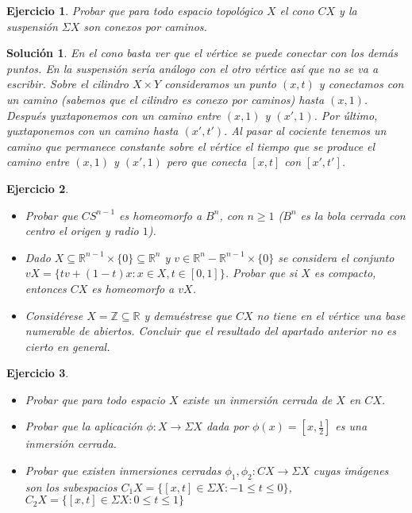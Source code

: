 \documentclass{article}
\theoremstyle{plain}
\newtheorem{exercise}{Ejercicio}
\newtheorem*{sol*}{Solución}
\begin{document}
\newpage
\begin{exercise}
Probar que para todo espacio topológico $X$ el cono $C X$ y la suspensión $\Sigma X$ son conexos por caminos.
\end{exercise}
\begin{sol*}
En el cono basta ver que el vértice se puede conectar con los demás puntos. En la suspensión sería análogo con el otro vértice así que no se va a escribir. Sobre el cilindro $X\times Y$ consideramos un punto $(x,t)$ y conectamos con un camino (sabemos que el cilindro es conexo por caminos) hasta $(x,1)$. Después yuxtaponemos con un camino entre $(x,1)$ y $(x',1)$. Por último, yuxtaponemos con un camino hasta $(x',t')$. Al pasar al cociente tenemos un camino que permanece constante sobre el vértice el tiempo que se produce el camino entre $(x,1)$ y $(x',1)$ pero que conecta $[x,t]$ con $[x',t']$.
\end{sol*}

\newpage
\begin{exercise}
\begin{itemize}
	\item Probar que $C S^{n-1}$ es homeomorfo a $B^n$, con $n \geq 1$ ($B^n$ es la bola cerrada con centro el origen y radio $1$).
	\item Dado $X \subseteq \mathbb{R}^{n-1} \times \{0\} \subseteq \mathbb{R}^n$ y $v \in \mathbb{R}^n-\mathbb{R}^{n-1} \times \{0\}$ se considera el conjunto $vX = \{ tv + (1-t)x : x \in X, t \in [0,1]\}$. Probar que si $X$ es compacto, entonces $C X$ es homeomorfo a $vX$.
	\item Considérese $X = \mathbb{Z} \subseteq \mathbb{R}$ y demuéstrese que $C X$ no tiene en el vértice una base numerable de abiertos. Concluir que el resultado del apartado anterior no es cierto en general.
\end{itemize}
\end{exercise}


\newpage
\begin{exercise}\mbox{}
\begin{itemize}
	\item Probar que para todo espacio $X$ existe un inmersión cerrada de $X$ en $C X$.
	\item Probar que la aplicación $\phi : X \to \Sigma X$ dada por $\phi(x) = [x, \frac{1}{2}]$ es una inmersión cerrada.
	\item Probar que existen inmersiones cerradas $\phi_1, \phi_2 : C X \to \Sigma X$ cuyas imágenes son los subespacios $C_1 X = \{[x,t] \in \Sigma X : -1 \leq t \leq 0\}$, $C_2 X = \{[x,t] \in \Sigma X : 0 \leq t \leq 1\}$
\end{itemize}
\end{exercise}
\end{document}
